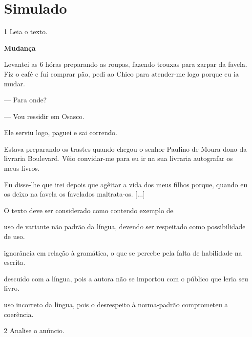 
\chapter[Simulado 2]{Simulado}

\num{1} Leia o texto.

\begin{myquote}
\textbf{Mudança}

Levantei as 6 hóras preparando as roupas, fazendo trouxas para zarpar da
favela. Fiz o café e fui comprar pão, pedi ao Chico para atender-me logo
porque eu ia mudar.

--- Para onde?

--- Vou ressidir em Osasco.

Ele serviu logo, paguei e sai correndo.

Estava preparando os trastes quando chegou o senhor Paulino de Moura
dono da livraria Boulevard. Vêio convidar-me para eu ir na sua livraria
autografar os meus livros.

Eu disse-lhe que irei depois que agêitar a vida dos meus filhos porque,
quando eu os deixo na favela os favelados maltrata-os. {[}...{]}

\end{myquote}

O texto deve ser considerado como contendo exemplo de

\begin{escolha}
\item uso de variante não padrão da língua, devendo ser respeitado como possibilidade de
uso.

\item ignorância em relação à gramática, o que se percebe pela falta de
habilidade na escrita.

\item descuido com a língua, pois a autora não se importou com o público
que leria seu livro.

\item uso incorreto da língua, pois o desrespeito à norma-padrão comprometeu a coerência.
\end{escolha}

\pagebreak

\num{2} Analise o anúncio.

